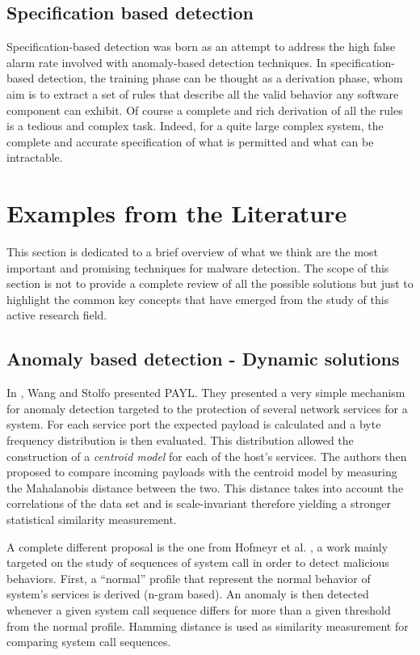 \documentclass{article}
\begin{document}
\subsection{Specification based detection} %
\label{sub:specification_based_detection}

Specification-based detection was born as an attempt to address the high false alarm rate involved with anomaly-based detection techniques. In specification-based detection, the training phase can be thought as a derivation phase, whom aim is to extract a set of rules that describe all the valid behavior any software component can exhibit. Of course a complete and rich derivation of all the rules is a tedious and complex task. Indeed, for a quite large complex system, the complete and accurate specification of what is permitted and what can be intractable.


\section{Examples from the Literature}

This section is dedicated to a brief overview of what we think are the most important and promising techniques for malware detection. The scope of this section is not to provide a complete review of all the possible solutions but just to highlight the common key concepts that have emerged from the study of this active research field.

\subsection{Anomaly based detection - Dynamic solutions}

In \cite{wang04raid-payl}, Wang and Stolfo presented PAYL. They presented a very simple mechanism for anomaly detection targeted to the protection of several network services for a system. For each service port the expected payload is calculated and a byte frequency distribution is then evaluated. This distribution allowed the construction of a \emph{centroid model} for each of the host's services. The authors then proposed to compare incoming payloads with the centroid model by measuring the Mahalanobis distance between the two. This distance takes into account the correlations of the data set and is scale-invariant therefore yielding a stronger statistical similarity measurement.

A complete different proposal is the one from Hofmeyr et al. \cite{Hofmeyr}, a work mainly targeted on the study of sequences of system call in order to detect malicious behaviors. First, a ``normal'' profile that represent the normal behavior of system's services is derived (n-gram based). An anomaly is then detected whenever a given system call sequence differs for more than a given threshold from the normal profile. Hamming distance is used as similarity measurement for comparing system call sequences.
\end{document}
